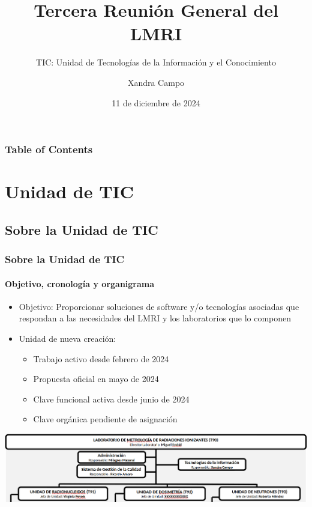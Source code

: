 \documentclass{beamer}
\title{Tercera Reunión General del LMRI}
\subtitle{TIC: Unidad de Tecnologías de la Información y el Conocimiento}
\author[X. Campo]{Xandra Campo}
\institute[LMRI-CIEMAT]{Laboratorio de Metrología de Radiaciones Ionizantes (LMRI) \newline CIEMAT}
\date{11 de diciembre de 2024}<
\newcommand{\highlight}[1]{{\color{blue} #1}}
\newcommand{\pending}[1]{{\color{red} #1}}
\newcommand{\done}{{\color{green}\ding{52}}}
\newcommand{\todo}{{\color{red}\ding{56}}}
\begin{document}
	\maketitle

	\begin{frame}
		\frametitle{Table of Contents}
		\tableofcontents
	\end{frame}

	\section{Unidad de TIC}
	
	\subsection{Sobre la Unidad de TIC}
	
	\begin{frame}
		\frametitle{Sobre la Unidad de TIC}
		\framesubtitle{Objetivo, cronología y organigrama}
		\begin{itemize}
			\item \highlight{Objetivo}: Proporcionar soluciones de software y/o tecnologías asociadas que respondan a las necesidades del LMRI y los laboratorios que lo componen
			\item Unidad de \highlight{nueva creación}:
			\begin{itemize}
				\item Trabajo activo desde febrero de 2024  \done
				\item Propuesta oficial en mayo de 2024 \done
				\item Clave funcional activa desde junio de 2024 \done
				\item \pending{Clave orgánica pendiente de asignación} \todo
			\end{itemize}
		\end{itemize}
		\includegraphics[width=\textwidth]{organigrama}
	\end{frame}
	
\end{document}
